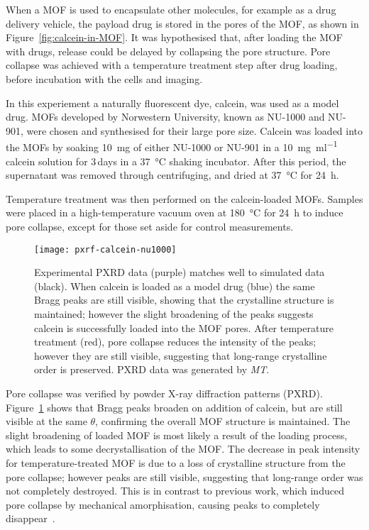 When a MOF is used to encapsulate other molecules, for example as a drug delivery vehicle, the payload drug is stored in the pores of the MOF, as shown in Figure~\ref{fig:calcein-in-MOF}.
It was hypothesised that, after loading the MOF with drugs, release could be delayed by collapsing the pore structure.
Pore collapse was achieved with a temperature treatment step after drug loading, before incubation with the cells and imaging.

In this experiement a naturally fluorescent dye, calcein, was used as a model drug.
MOFs developed by Norwestern University, known as NU-1000 and NU-901, were chosen and synthesised for their large pore size.
Calcein was loaded into the MOFs by soaking \SI{10}{\milli\gram} of either NU-1000 or NU-901 in a \SI[per-mode=symbol]{10}{\milli\gram\per\milli\litre} calcein solution for 3\,days in a \SI{37}{\degreeCelsius} shaking incubator.
After this period, the supernatant was removed through centrifuging, and dried at \SI{37}{\degreeCelsius} for \SI{24}{\hour}.

Temperature treatment was then performed on the calcein-loaded MOFs.
Samples were placed in a high-temperature vacuum oven at \SI{180}{\degreeCelsius} for \SI{24}{\hour} to induce pore collapse, except for those set aside for control measurements.

\begin{figure}[b!]
\centering
\texttt{[image: pxrf-calcein-nu1000]}
\caption[MOFs: PXRD confirms calcein enters NU-1000 and temperature treatment causes partial pore collapse]{ Experimental PXRD data (purple) matches well to simulated data (black). When calcein is loaded as a model drug (blue) the same Bragg peaks are still visible, showing that the crystalline structure is maintained; however the slight broadening of the peaks suggests calcein is successfully loaded into the MOF pores. After temperature treatment (red), pore collapse reduces the intensity of the peaks; however they are still visible, suggesting that long-range crystalline order is preserved. PXRD data was generated by \textit{MT}. }
\label{fig:MOF-PXRF}
\end{figure}

Pore collapse was verified by powder X-ray diffraction patterns (PXRD).
Figure~\ref{fig:MOF-PXRF} shows that Bragg peaks broaden on addition of calcein, but are still visible at the same $\theta$, confirming the overall MOF structure is maintained.
The slight broadening of loaded MOF is most likely a result of the loading process, which leads to some decrystallisation of the MOF.
The decrease in peak intensity for temperature-treated MOF is due to a loss of crystalline structure from the pore collapse; however peaks are still visible, suggesting that long-range order was not completely destroyed.
This is in contrast to previous work, which induced pore collapse by mechanical amorphisation, causing peaks to completely disappear~\cite{orellana2015amorphous}.

